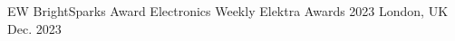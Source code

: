 
\begin{cvhonors}

  \cvhonor
    {EW BrightSparks Award} %
    {Electronics Weekly Elektra Awards 2023} %
    {London, UK} %
    {Dec. 2023} %

\end{cvhonors}